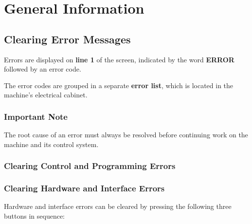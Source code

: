 \chapter{General Information}

\section{Clearing Error Messages}

Errors are displayed on \textbf{line 1} of the screen, indicated by the word \textbf{ERROR} followed by an error code.

The error codes are grouped in a separate \textbf{error list}, which is located in the machine's electrical cabinet.

\subsection{Important Note}

The root cause of an error must always be resolved before continuing work on the machine and its control system.

\subsection{Clearing Control and Programming Errors}

\begin{itemize}
\end{itemize}

\subsection{Clearing Hardware and Interface Errors}

Hardware and interface errors can be cleared by pressing the following three buttons in sequence:

\begin{itemize}
    \vspace{.6cm}
    \vspace{.6cm}
\end{itemize}

\vspace{.5cm}

